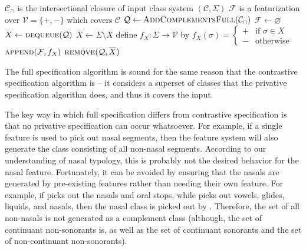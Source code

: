 \documentclass[11pt, oneside]{article}   	%
\begin{document}
\vspace{\baselineskip} \noindent \begin{algorithmic}
    \REQUIRE $\mathcal C_\cap$ is the intersectional closure of input class system $(\mathcal C, \Sigma)$
    \ENSURE $\mathcal F$ is a featurization over $\mathcal V = \{ +, - \}$ which covers $\mathcal C$
    \STATE
    \STATE $\mathcal Q \leftarrow \textsc{AddComplementsFull}(\mathcal{C_\cap})$
    \STATE $\mathcal F \leftarrow \varnothing$
    \STATE
        \STATE $X \leftarrow \textsc{dequeue}(\mathcal Q)$
	        \STATE $\overline{X} \leftarrow \Sigma \setminus X$
            \STATE define $f_X : \Sigma \rightarrow \mathcal V$ by $f_X (\sigma) = \begin{cases}
                    + & \text{if } \sigma \in X \\
                    - & \text{otherwise}
                    \end{cases}$
            \STATE $\textsc{append}(\mathcal F, f_X)$
            \STATE $\textsc{remove}(\mathcal{Q}, \overline{X})$
        \ENDIF
    \ENDWHILE
\end{algorithmic}

\vspace{\baselineskip} \noindent The full specification algorithm is sound for the same reason that the contrastive specification algorithm is -- it considers a superset of classes that the privative specification algorithm does, and thus it covers the input.

\vspace{\baselineskip} The key way in which full specification differs from contrastive specification is that no privative specification can occur whatsoever. For example, if a single feature  is used to pick out nasal segments, then the feature system will also generate the class  consisting of all non-nasal segments. According to our understanding of nasal typology, this is probably not the desired behavior for the nasal feature. Fortunately, it can be avoided by ensuring that the nasals are generated by pre-existing features rather than needing their own feature. For example, if  picks out the nasals and oral stops, while  picks out vowels, glides, liquids, and nasals, then the nasal class is picked out by . Therefore, the set of all non-nasals is not generated as a complement class (although, the set of continuant non-sonorants is, as well as the set of continuant sonorants and the set of non-continuant non-sonorants).
\end{document}
